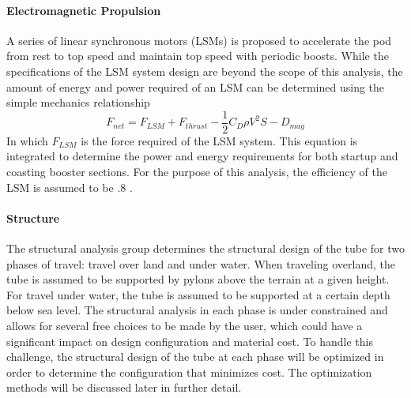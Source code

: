 \paragraph{Electromagnetic Propulsion}
	A series of linear synchronous motors (LSMs) is proposed to accelerate the
	pod from rest to top speed and maintain top speed with periodic boosts.
	While the specifications of the LSM system design are beyond the scope of
	this analysis, the amount of energy and power required of an LSM can be
	determined using the simple mechanics relationship
	\begin{equation}
		\label{eq:sum_of_forces}
		F_{net} = F_{LSM} + F_{thrust} - \frac{1}{2}C_{D}\rho V^{2}S - D_{mag}
	\end{equation}
	In which $F_{LSM}$ is the force required of the LSM system. This equation
	is integrated to determine the power and energy requirements for both
	startup and coasting booster sections. For the purpose of this analysis,
	the efficiency of the LSM is assumed to be .8 \cite{LSM}.
\paragraph{Structure}
	The structural analysis group determines the structural design of the tube
	for two phases of travel: travel over land and under water. When traveling
	overland, the tube is assumed to be supported by pylons above the terrain
	at a given height. For travel under water, the tube is assumed to be
	supported at a certain depth below sea level. The structural analysis in
	each phase is under constrained and allows for several free choices to be
	made by the user, which could have a significant impact on design
	configuration and material cost. To handle this challenge, the structural
	design of the tube at each phase will be optimized in order to determine
	the configuration that minimizes cost. The optimization methods will be
	discussed later in further detail.

